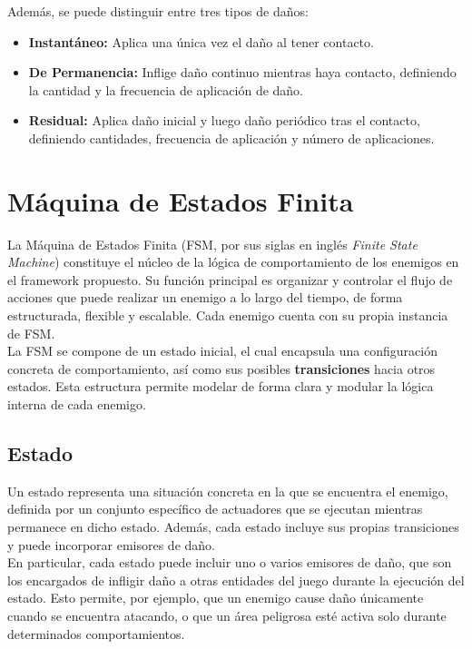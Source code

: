 Además, se puede distinguir entre tres tipos de daños:
\begin{itemize}
    \item \textbf{Instantáneo:} Aplica una única vez el daño al tener contacto.
    \item \textbf{De Permanencia:} Inflige daño continuo mientras haya contacto, definiendo la cantidad y la frecuencia de aplicación de daño.
    \item \textbf{Residual:} Aplica daño inicial y luego daño periódico tras el contacto, definiendo cantidades, frecuencia de aplicación y número de aplicaciones.
\end{itemize}

\section{Máquina de Estados Finita}
\label{sec:fsm}

La Máquina de Estados Finita (FSM, por sus siglas en inglés \textit{Finite State Machine}) constituye el núcleo de la lógica de comportamiento de los enemigos en el framework propuesto. Su función principal es organizar y controlar el flujo de acciones que puede realizar un enemigo a lo largo del tiempo, de forma estructurada, flexible y escalable. Cada enemigo cuenta con su propia instancia de FSM.\\

La FSM se compone de un estado inicial, el cual encapsula una configuración concreta de comportamiento, así como sus posibles \textbf{transiciones} hacia otros estados. Esta estructura permite modelar de forma clara y modular la lógica interna de cada enemigo.

\subsection{Estado}
\label{subsec:estado}

Un estado representa una situación concreta en la que se encuentra el enemigo, definida por un conjunto específico de actuadores que se ejecutan mientras permanece en dicho estado. Además, cada estado incluye sus propias transiciones y puede incorporar emisores de daño.\\

En particular, cada estado puede incluir uno o varios emisores de daño, que son los encargados de infligir daño a otras entidades del juego durante la ejecución del estado. Esto permite, por ejemplo, que un enemigo cause daño únicamente cuando se encuentra atacando, o que un área peligrosa esté activa solo durante determinados comportamientos.

